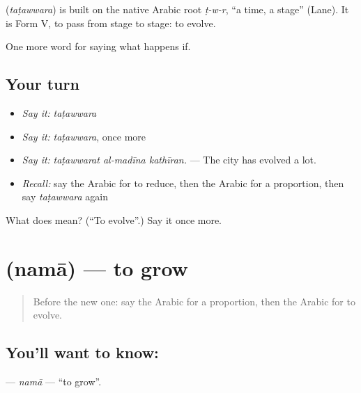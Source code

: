 \begin{cousinweb}
\textbf{} (\emph{taṭawwara}) is built on the native Arabic root \emph{ṭ-w-r}, \textquotedblleft{}a time, a stage\textquotedblright{} (Lane). It is Form V, to pass from stage to stage: to evolve.
\end{cousinweb}

\begin{grammarlens}[title={What you've built}]
One more word for saying what happens if.
\end{grammarlens}

\subsection*{Your turn}
\begin{itemize}
\raggedright
  \item \emph{Say it:} \emph{taṭawwara}
  \item \emph{Say it:} \emph{taṭawwara}, once more
  \item \emph{Say it:} \emph{taṭawwarat al-madīna kathīran.} — The city has evolved a lot.
  \item \emph{Recall:} say the Arabic for to reduce, then the Arabic for a proportion, then say \emph{taṭawwara} again
\end{itemize}

\begin{tcolorbox}[breakable,colback=teal!4,colframe=teal!35!black,title={Before you move on}]
What does  mean? (\textquotedblleft{}To evolve\textquotedblright{}.) Say it once more.
\end{tcolorbox}
\section[\texorpdfstring{\ar{نما} (namā)}{نما (namā)}]{ (namā) — to grow}

\label{lesson:AR-C413-nama-grow}



\begin{quote}
Before the new one: say the Arabic for a proportion, then the Arabic for to evolve.
\end{quote}

\subsection*{You'll want to know: }
\textbf{} — \emph{namā} — \textquotedblleft{}to grow\textquotedblright{}.

